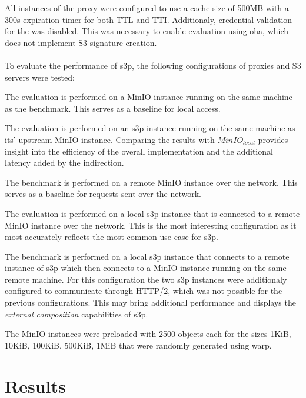 All instances of the proxy were configured to use a cache size of 500MB with a 300s expiration timer for both TTL and TTI. Additionaly, credential validation for the  was disabled. This was necessary to enable evaluation using oha, which does not implement S3 signature creation.
\\\\
To evaluate the performance of s3p, the following configurations of proxies and S3 servers were tested:
\begin{description}[style=nextline] %
	\item[${MinIO}_{local}$] The evaluation is performed on a MinIO instance running on the same machine as the benchmark. This serves as a baseline for local access.
	\item[${s3p}_{local}$] The evaluation is performed on an s3p instance running on the same machine as its' upstream MinIO instance. Comparing the results with ${MinIO}_{local}$ provides insight into the efficiency of the overall implementation and the additional latency added by the indirection.
	\item[${MinIO}_{remote}$] The benchmark is performed on a remote MinIO instance over the network. This serves as a baseline for requests sent over the network.
	\item[${s3p}_{remote}$] The evaluation is performed on a local s3p instance that is connected to a remote MinIO instance over the network. This is the most interesting configuration as it most accurately reflects the most common use-case for s3p.
	\item[${s3p}_{dual}$] The benchmark is performed on a local s3p instance that connects to a remote instance of s3p which then connects to a MinIO instance running on the same remote machine. For this configuration the two s3p instances were additionaly configured to communicate through HTTP/2, which was not possible for the previous configurations. This may bring additional performance and displays the \textit{external composition} capabilities of s3p.
\end{description}

The MinIO instances were preloaded with 2500 objects each for the sizes 1KiB, 10KiB, 100KiB, 500KiB, 1MiB that were randomly generated using warp.

\section{Results}

